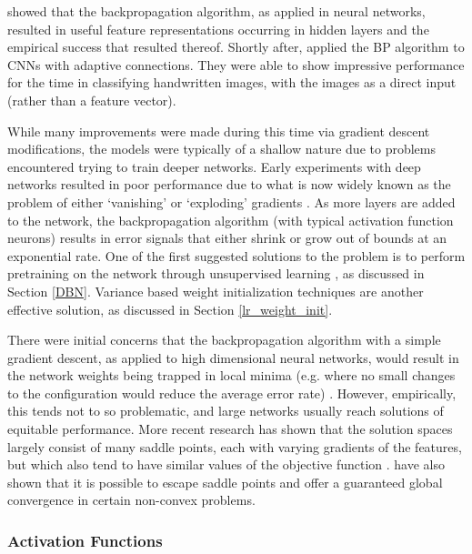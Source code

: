 \documentclass[a4paper,11pt,oneside]{article}
\theoremstyle{plain}
\theoremstyle{definition}
\begin{document}
	\citet{Rumelhart} showed that the backpropagation algorithm, as applied in neural networks, resulted in useful feature representations 
	occurring in hidden layers and the empirical success that resulted thereof.  
	Shortly after, \citet{LeCun3} applied the BP algorithm to CNNs with adaptive connections. They were able to show 
	impressive performance for the time in classifying handwritten images, with the images as a direct input (rather than a feature vector).
	\hfill \break 
	
	While many improvements were made during this time via gradient descent modifications, the 
	models were typically of a shallow nature due to problems encountered trying to train deeper networks. 
	Early experiments with deep networks resulted in poor performance due to what is now widely known as the problem 
	of either `vanishing' or `exploding' gradients \citep{Pascanu}. As more layers are added to the network, the backpropagation 
	algorithm (with typical activation function neurons) results in error signals that either shrink or grow out of bounds at an 
	exponential rate. One of the first suggested solutions to the problem is to perform pretraining on the 
	network through unsupervised learning  \citep{Schmidhuber}, as discussed in Section \ref{DBN}. Variance based 
	weight initialization techniques are another effective solution, as discussed in Section \ref{lr_weight_init}.
	\hfill \break 
	
	There were initial concerns that the backpropagation algorithm with a simple gradient descent, as applied to high dimensional neural networks, would result 
	in the network weights being trapped in local minima (e.g. where no small 
	changes to the configuration would reduce the average error rate) \citep{LeCun4}. 
	However, empirically, this tends not to so problematic, and large networks usually reach solutions of equitable 
	performance. More recent research has shown that the solution spaces largely consist of many saddle points, each 
	with varying gradients of the features, but which also tend to have similar values of the objective function \citep{Dauphin}. 
	\citet{Ge} have also shown that it is possible to escape saddle points and offer a guaranteed global convergence 
	in certain non-convex problems.
	\hfill \break 
	
	\subsubsection{Activation Functions}\label{lr_activationfunctions}
	
\end{document}
